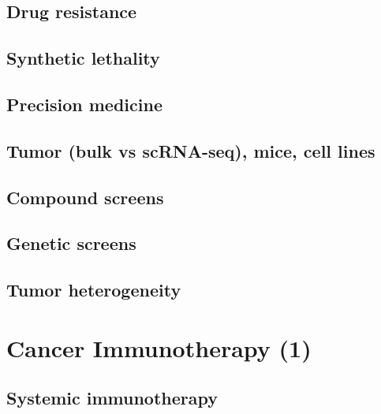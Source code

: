 \documentclass[]{book}
\begin{document}
\hypertarget{drug-resistance}{%
\section{Drug resistance}\label{drug-resistance}}

\hypertarget{synthetic-lethality}{%
\section{Synthetic lethality}\label{synthetic-lethality}}

\hypertarget{precision-medicine}{%
\section{Precision medicine}\label{precision-medicine}}

\hypertarget{tumor-bulk-vs-scrna-seq-mice-cell-lines}{%
\section{Tumor (bulk vs scRNA-seq), mice, cell lines}\label{tumor-bulk-vs-scrna-seq-mice-cell-lines}}

\hypertarget{compound-screens}{%
\section{Compound screens}\label{compound-screens}}

\hypertarget{genetic-screens}{%
\section{Genetic screens}\label{genetic-screens}}

\hypertarget{tumor-heterogeneity}{%
\section{Tumor heterogeneity}\label{tumor-heterogeneity}}

\hypertarget{cancerimmuno1}{%
\chapter{Cancer Immunotherapy (1)}\label{cancerimmuno1}}

\hypertarget{systemic-immunotherapy}{%
\section{Systemic immunotherapy}\label{systemic-immunotherapy}}
\end{document}
